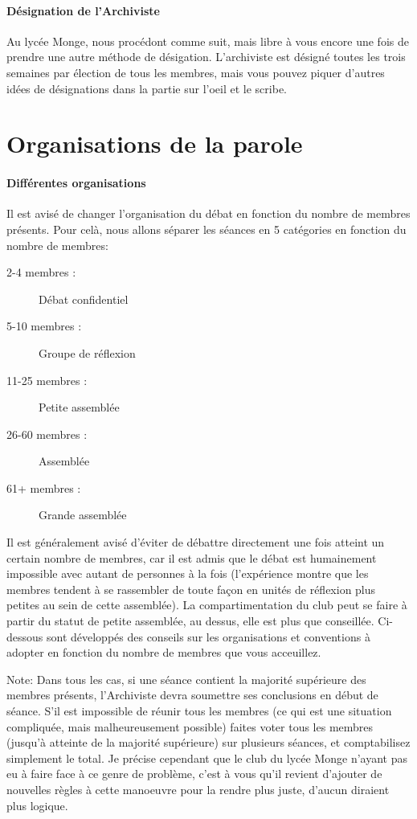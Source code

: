 \documentclass[a4paper,12pt]{article}
\begin{document}
\paragraph{Désignation de l'Archiviste}
Au lycée Monge, nous procédont comme suit, mais libre à vous encore une fois de prendre une autre méthode de désigation. L'archiviste est désigné toutes les trois semaines par élection de tous les membres, mais vous pouvez piquer d'autres idées de désignations dans la partie sur l'oeil et le scribe. 

\section{Organisations de la parole}
\paragraph{Différentes organisations}
Il est avisé de changer l'organisation du débat en fonction du nombre de membres présents. Pour celà, nous allons séparer les séances en 5 catégories en fonction du nombre de membres:
\begin{description}
 \item[2-4 membres :] Débat confidentiel
 \item[5-10 membres :] Groupe de réflexion
 \item[11-25 membres :] Petite assemblée
 \item[26-60 membres :] Assemblée
 \item[61+ membres :] Grande assemblée
\end{description}

Il est généralement avisé d'éviter de débattre directement une fois atteint un certain nombre de membres, car il est admis que le débat est humainement impossible avec autant de personnes à la fois (l'expérience montre que les membres tendent à se rassembler de toute façon en unités de réflexion plus petites au sein de cette assemblée). La compartimentation du club peut se faire à partir du statut de petite assemblée, au dessus, elle est plus que conseillée. Ci-dessous sont développés des conseils sur les organisations et conventions à adopter en fonction du nombre de membres que vous acceuillez.

Note: Dans tous les cas, si une séance contient la majorité supérieure des membres présents, l'Archiviste devra soumettre ses conclusions en début de séance. S'il est impossible de réunir tous les membres (ce qui est une situation compliquée, mais malheureusement possible) faites voter tous les membres (jusqu'à atteinte de la majorité supérieure) sur plusieurs séances, et comptabilisez simplement le total. Je précise cependant que le club du lycée Monge n'ayant pas eu à faire face à ce genre de problème, c'est à vous qu'il revient d'ajouter de nouvelles règles à cette manoeuvre pour la rendre plus juste, d'aucun diraient plus logique.
\end{document}
